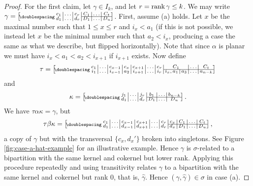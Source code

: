 \begin{lemma}
\begin{proof}
    For the first claim, let $\gamma \in I_k$, and let $r = \operatorname{rank}\gamma \leq k$.
    We may write $\gamma = \bipart{c|c|c|c|c|c}{4-6}
    {c_1 & \ldots & c_r & C_1 & \ldots & C_t}
    {d_1 & \ldots & d_r & D_1 & \ldots & D_u}$.
    First, assume (a) holds.
    Let $x$ be the maximal number such that $1 \leq x \leq r$ and $i_x < a_1$
    (if this is not possible, we instead let $x$ be the minimal number such that
    $a_2 < i_x$, producing a case the same as what we describe, but flipped
    horizontally).  Note
    that since $\alpha$ is planar we must have $i_x < a_1 < a_2 < i_{x+1}$ if
    $i_{x+1}$ exists.  Now define
    $$\tau = \bipart{c|c|c|c|c|c|c|c|c|c|c}{8-11}
    {c_1 & \ldots & c_{x-1} & c_x & c_{x+1} & \ldots & c_r
      & \mc2{c|}{C_1} & \ldots & C_t}
    {i_1 & \ldots & i_{x-1} & a_2 & i_{x+1} & \ldots & i_r
      & i_x, a_1 & a_3 & \ldots & a_{n-k}}$$
    and $$\kappa = \bipart{c|c|c|c|c|c}{4-6}
    {j_1 & \ldots & j_r & b_1 & \ldots & b_{n-k}}
    {d_1 & \ldots & d_r & D_1 & \ldots & D_u}.$$
    We have $\tau\alpha\kappa = \gamma$, but
    $$\tau\beta\kappa = \bipart{c|c|c|c|c|c|c|c|c|c}{7-10}
    {c_1 & \ldots & c_{x-1} & c_{x+1} & \ldots & c_r & c_x
      & C_1 & \ldots & C_t}
    {d_1 & \ldots & d_{x-1} & d_{x+1} & \ldots & d_r & d_x
      & D_1 & \ldots & D_u},$$
    a copy of $\gamma$ but with the transversal $\{c_x, d_x'\}$ broken into
    singletons.  See Figure \ref{fig:case-a-hat-example} for an illustrative
    example.  Hence $\gamma$ is $\sigma$-related to a bipartition with the same
    kernel and cokernel but lower rank.  Applying this procedure repeatedly
    and using transitivity
    relates $\gamma$ to a bipartition with the same kernel and cokernel but rank
    $0$, that is, $\widehat\gamma$.  Hence $(\gamma, \widehat\gamma) \in \sigma$
    in case (a).


\end{proof}
\end{lemma}
